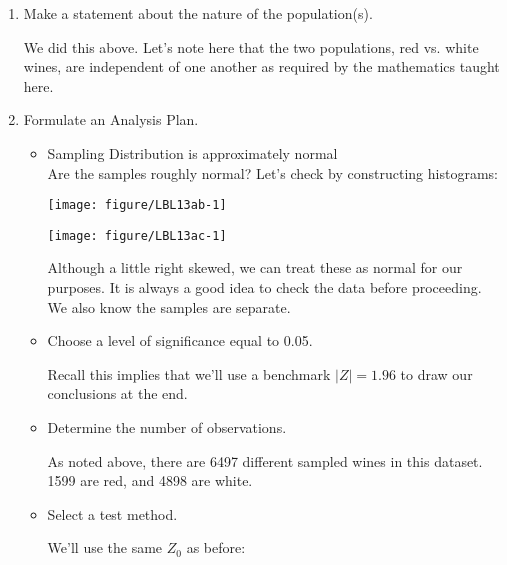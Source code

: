 \documentclass[11pt]{book}\usepackage[]{graphicx}\usepackage[]{color}
\begin{document}
\begin{enumerate}
\item Make a statement about the nature of the population(s).

We did this above. Let’s note here that the two populations, red vs. white wines, are independent of one another as required by the mathematics taught here.

\item Formulate an Analysis Plan.

  \begin{itemize}
  \item Sampling Distribution is approximately normal \\ Are the samples roughly normal? Let’s check by constructing histograms:
  
\begin{minipage}[ht]{6cm}



{\centering \texttt{[image: figure/LBL13ab-1]} 

}




\end{minipage}
\begin{minipage}[ht]{6cm}



{\centering \texttt{[image: figure/LBL13ac-1]} 

}



\end{minipage}


Although a little right skewed, we can treat these as normal for our purposes. It is always a good idea to check the data before proceeding. We also know the samples are separate.

  \item Choose a level of significance equal to 0.05.

  Recall this implies that we'll use a benchmark $|Z| = 1.96$ to draw our conclusions at the end.
  
  \item Determine the number of observations.
  
  As noted above, there are 6497 different sampled wines in this dataset. 1599 are
red, and 4898 are white.

  \item Select a test method.
  
  We'll use the same $Z_0$ as before:
  

\end{itemize}
\end{enumerate}
\end{document}
